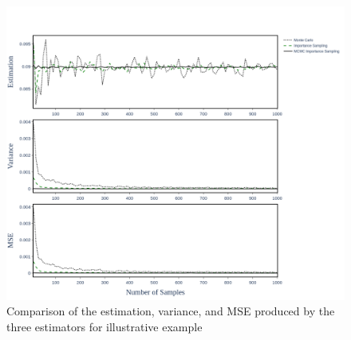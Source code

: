     \begin{figure}[H]
        \centering
        \includegraphics[scale=0.30]{Figures/Images/Illustrative Example/running_properties.png}
        \caption{Comparison of the estimation, variance, and MSE produced by the three estimators for illustrative example}
        \label{fig:running_properties}
    \end{figure}